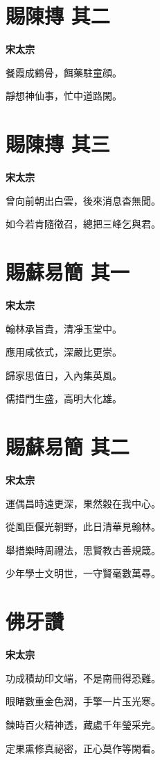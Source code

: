 \documentclass[12pt,a4paper]{ctexbook}
\begin{document}
\section{賜陳摶  其二}
\textbf{宋太宗}\par\vspace{0.5em}
餐霞成鶴骨，餌藥駐童顔。\par
靜想神仙事，忙中道路閑。\par

\section{賜陳摶  其三}
\textbf{宋太宗}\par\vspace{0.5em}
曾向前朝出白雲，後來消息杳無聞。\par
如今若肯隨徵召，總把三峰乞與君。\par

\section{賜蘇易簡  其一}
\textbf{宋太宗}\par\vspace{0.5em}
翰林承旨貴，清凈玉堂中。\par
應用咸依式，深嚴比更崇。\par
歸家思值日，入內集英風。\par
儒措門生盛，高明大化雄。\par

\section{賜蘇易簡  其二}
\textbf{宋太宗}\par\vspace{0.5em}
運偶昌時遠更深，果然穀在我中心。\par
從風臣偃光朝野，此日清華見翰林。\par
舉措樂時周禮法，思賢教古善規箴。\par
少年學士文明世，一守賢毫數萬尋。\par

\section{佛牙讚}
\textbf{宋太宗}\par\vspace{0.5em}
功成積劫印文端，不是南冊得恐難。\par
眼睹數重金色潤，手擎一片玉光寒。\par
鍊時百火精神透，藏處千年瑩采完。\par
定果熏修真祕密，正心莫作等閑看。\par
\end{document}

